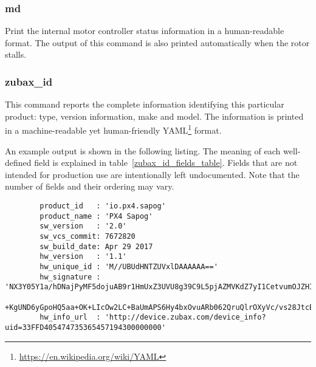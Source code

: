 \documentclass{zubaxdoc}
\begin{document}
	\subsubsection{md}
	
	Print the internal motor controller status information in a human-readable format.
	The output of this command is also printed automatically when the rotor stalls.
	
	\subsubsection{zubax\_id}\label{sec:cli_zubax_id}
	
	This command reports the complete information identifying this particular product:
	type, version information, make and model.
	The information is printed in a machine-readable yet human-friendly
	YAML\footnote{\url{https://en.wikipedia.org/wiki/YAML}} format.
	
	An example output is shown in the following listing.
	The meaning of each well-defined field is explained in table~\ref{zubax_id_fields_table}.
	Fields that are not intended for production use are intentionally left undocumented.
	Note that the number of fields and their ordering may vary.
	
	\begin{verbatim}
		product_id   : 'io.px4.sapog'
		product_name : 'PX4 Sapog'
		sw_version   : '2.0'
		sw_vcs_commit: 7672820
		sw_build_date: Apr 29 2017
		hw_version   : '1.1'
		hw_unique_id : 'M//UBUdHNTZUVxlDAAAAAA=='
		hw_signature : 'NX3Y05Y1a/hDNajPyMF5dojuAB9r1HmUxZ3UVU8g39C9L5pjAZMVKdZ7yI1CetvumOJZHIjRYkHOBmMAEKvRU/3mpG\
		+KgUND6yGpoHQ5aa+OK+LIcOw2LC+BaUmAPS6Hy4bxOvuARb062QruQlrOXyVc/vs28JtcBzOZo/b/OxY='
		hw_info_url  : 'http://device.zubax.com/device_info?uid=33FFD405474735365457194300000000'
	\end{verbatim}
	
\end{document}
